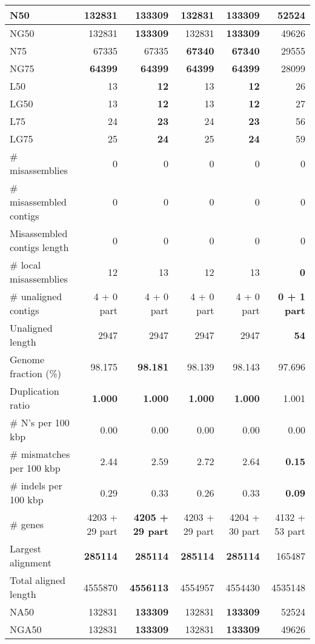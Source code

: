 \documentclass[12pt,a4paper]{article}
\begin{document}
\begin{table}[ht]
\begin{center}
\begin{tabular}{|l*{5}{|r}|}
N50 & 132831 & {\bf 133309} & 132831 & {\bf 133309} & 52524 \\ \hline
NG50 & 132831 & {\bf 133309} & 132831 & {\bf 133309} & 49626 \\ \hline
N75 & 67335 & 67335 & {\bf 67340} & {\bf 67340} & 29555 \\ \hline
NG75 & {\bf 64399} & {\bf 64399} & {\bf 64399} & {\bf 64399} & 28099 \\ \hline
L50 & 13 & {\bf 12} & 13 & {\bf 12} & 26 \\ \hline
LG50 & 13 & {\bf 12} & 13 & {\bf 12} & 27 \\ \hline
L75 & 24 & {\bf 23} & 24 & {\bf 23} & 56 \\ \hline
LG75 & 25 & {\bf 24} & 25 & {\bf 24} & 59 \\ \hline
\# misassemblies & 0 & 0 & 0 & 0 & 0 \\ \hline
\# misassembled contigs & 0 & 0 & 0 & 0 & 0 \\ \hline
Misassembled contigs length & 0 & 0 & 0 & 0 & 0 \\ \hline
\# local misassemblies & 12 & 13 & 12 & 13 & {\bf 0} \\ \hline
\# unaligned contigs & 4 + 0 part & 4 + 0 part & 4 + 0 part & 4 + 0 part & {\bf 0 + 1 part} \\ \hline
Unaligned length & 2947 & 2947 & 2947 & 2947 & {\bf 54} \\ \hline
Genome fraction (\%) & 98.175 & {\bf 98.181} & 98.139 & 98.143 & 97.696 \\ \hline
Duplication ratio & {\bf 1.000} & {\bf 1.000} & {\bf 1.000} & {\bf 1.000} & 1.001 \\ \hline
\# N's per 100 kbp & 0.00 & 0.00 & 0.00 & 0.00 & 0.00 \\ \hline
\# mismatches per 100 kbp & 2.44 & 2.59 & 2.72 & 2.64 & {\bf 0.15} \\ \hline
\# indels per 100 kbp & 0.29 & 0.33 & 0.26 & 0.33 & {\bf 0.09} \\ \hline
\# genes & 4203 + 29 part & {\bf 4205 + 29 part} & 4203 + 29 part & 4204 + 30 part & 4132 + 53 part \\ \hline
Largest alignment & {\bf 285114} & {\bf 285114} & {\bf 285114} & {\bf 285114} & 165487 \\ \hline
Total aligned length & 4555870 & {\bf 4556113} & 4554957 & 4554430 & 4535148 \\ \hline
NA50 & 132831 & {\bf 133309} & 132831 & {\bf 133309} & 52524 \\ \hline
NGA50 & 132831 & {\bf 133309} & 132831 & {\bf 133309} & 49626 \\ \hline

\end{tabular}
\end{center}
\end{table}
\end{document}
